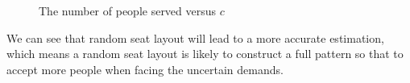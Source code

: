 \begin{figure}[ht]
  \centering
  \caption{The number of people served versus $c$}
\end{figure}

We can see that random seat layout will lead to a more accurate estimation, which means a random seat layout is likely to construct a full pattern so that to accept more people when facing the uncertain demands.

\newpage










